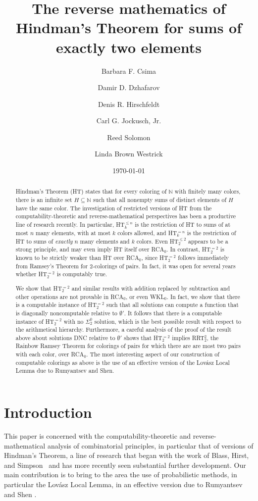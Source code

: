 \documentclass{amsart}
\title[The reverse mathematics of HT for sums of exactly two
elements]{The reverse mathematics of Hindman's Theorem for sums of
exactly two elements}
\author[Csima]{Barbara F. Csima}
\author[Dzhafarov]{Damir D. Dzhafarov}
\author[Hirschfeldt]{Denis R. Hirschfeldt}
\author[Jockusch]{Carl G. Jockusch, Jr.}
\author[Solomon]{Reed Solomon}
\author[Westrick]{Linda Brown Westrick}
\date{\today}
\theoremstyle{definition}
\begin{document}
\begin{abstract}
Hindman's Theorem (HT) states that for every coloring of $\mathbb N$
with finitely many colors, there is an infinite set $H \subseteq
\mathbb N$ such that all nonempty sums of distinct elements of $H$
have the same color. The investigation of restricted versions of HT
from the computability-theoretic and reverse-mathematical perspectives
has been a productive line of research recently. In particular,
HT$^{\leqslant n}_k$ is the restriction of HT to sums of at most $n$
many elements, with at most $k$ colors allowed, and HT$^{=n}_k$ is the
restriction of HT to sums of \emph{exactly} $n$ many elements and $k$
colors. Even HT$^{\leqslant 2}_2$ appears to be a strong principle,
and may even imply HT itself over RCA$_0$. In
contrast, HT$^{=2}_2$ is known to be strictly weaker than HT over
RCA$_0$, since HT$^{=2}_2$ follows immediately from Ramsey's Theorem
for $2$-colorings of pairs. In fact, it was open for several years
whether HT$^{=2}_2$ is computably true.

We show that HT$^{=2}_2$ and similar results with addition replaced by
subtraction and other operations are not provable in RCA$_0$, or even
WKL$_0$. In fact, we show that there is a computable instance of
HT$^{=2}_2$ such that all solutions can compute a function that is
diagonally noncomputable relative to $\emptyset'$. It follows that
there is a computable instance of HT$^{=2}_2$ with no $\Sigma^0_2$
solution, which is the best possible result with respect to the
arithmetical hierarchy. Furthermore, a careful analysis of the proof
of the result above about solutions DNC relative to $\emptyset'$ shows
that HT$^{=2}_2$ implies RRT$^2_2$, the Rainbow Ramsey Theorem for
colorings of pairs for which there are are most two pairs with each
color, over RCA$_0$. The most interesting aspect of our construction
of computable colorings as above is the use of an effective version of
the Lov\'asz Local Lemma due to Rumyantsev and Shen.
\end{abstract}

\maketitle

\section{Introduction}

This paper is concerned with the computability-theoretic and
reverse-math\-e\-mat\-i\-cal analysis of combinatorial principles, in
particular that of versions of Hindman's Theorem, a line of research
that began with the work of Blass, Hirst, and Simpson~\cite{BHS} and
has more recently seen substantial further development. Our main
contribution is to bring to the area the use of probabilistic methods,
in particular the Lov{\'a}sz Local Lemma, in an effective version due
to Rumyantsev and Shen \cite{R,RS}.
\end{document}
